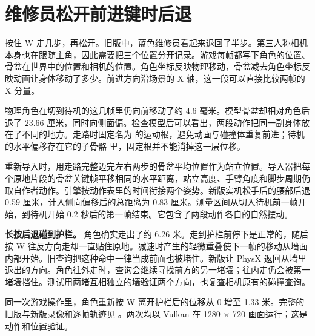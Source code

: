 \clearpage
\section{维修员松开前进键时后退}

按住 W 走几步，再松开。旧版中，蓝色维修员看起来退回了半步。第三人称相机本身也在跟随主角，因此需要把三个位置分开记录。游戏每帧都写下角色的位置、骨盆在世界中的位置和相机的位置。角色坐标反映物理移动，骨盆减去角色坐标反映动画让身体移动了多少。前进方向沿场景的 X 轴，这一段可以直接比较两帧的 X 分量。

物理角色在切到待机的这几帧里仍向前移动了约 4.6 毫米。模型骨盆却相对角色后退了 23.66 厘米，同时向侧面偏。检查模型后可以看出，两段动作把同一副身体放在了不同的地方。走路时固定名为  的运动根，避免动画与碰撞体重复前进；待机的水平偏移存在它的子骨骼  里，固定根并不能消掉这一层位移。

重新导入时，用走路完整迈完左右两步的骨盆平均位置作为站立位置。导入器把每个原地片段的骨盆关键帧平移相同的水平距离，站立高度、手臂角度和脚步周期仍取自作者动作。引擎按动作表里的时间衔接两个姿势。新版实机松手后的腰部后退 0.59 厘米，计入侧向偏移后的总距离为 0.83 厘米。测量区间从切入待机前一帧开始，到待机开始 0.2 秒后的第一帧结束。它包含了两段动作各自的自然摆动。


\textbf{长按后退碰到护栏。} 角色确实走出了约 6.26 米。走到护栏前停下是正常的，随后按 W 往反方向走却一直贴住原地。减速时产生的轻微重叠使下一帧的移动从墙面内部开始。旧查询把这种命中一律当成前面也被堵住。新版让 PhysX 返回从墙里退出的方向。角色往外走时，查询会继续寻找前方的另一堵墙；往内走仍会被第一堵墙挡住。测试用两堵互相独立的墙验证两个方向，也复查相机原有的碰撞查询。

同一次游戏操作里，角色重新按 W 离开护栏后的位移从 0 增至 1.33 米。完整的旧版与新版录像和逐帧轨迹见 。两次均以 Vulkan 在 1280 × 720 画面运行；这是动作和位置验证。

